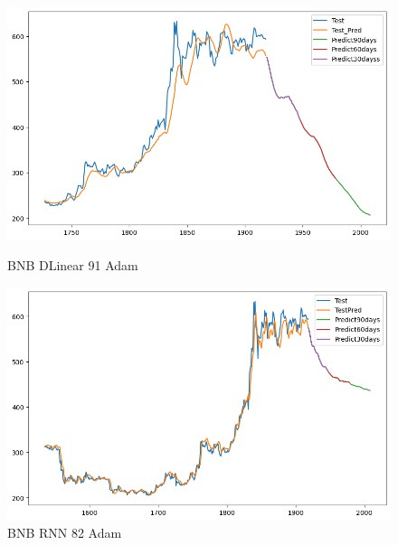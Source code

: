 \documentclass{ieeeojies}
\begin{document}
\begin{figure}[H]
  \centering
  \begin{minipage}{0.48\linewidth}
    \centering
    \includegraphics[width=1\textwidth]{image/BNB_DLinear_91_Adam.png}
    \caption{BNB DLinear 91 Adam}
    \label{fig:bnb-dlinear}
  \end{minipage}
  \hfill
  \begin{minipage}{0.48\linewidth}
    \centering
    \includegraphics[width=1\textwidth]{image/BNB_RNN_82_Adam.png}
    \caption{BNB RNN 82 Adam}
    \label{fig:bnb-rnn}
  \end{minipage}
\end{figure}
\end{document}
